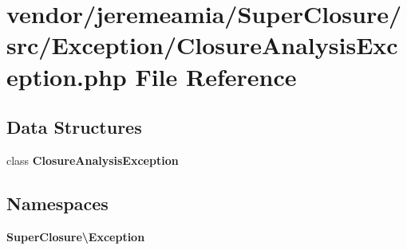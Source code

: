 \section{vendor/jeremeamia/\+Super\+Closure/src/\+Exception/\+Closure\+Analysis\+Exception.php File Reference}
\label{_closure_analysis_exception_8php}
\subsection*{Data Structures}
\begin{DoxyCompactItemize}
\item 
class {\bf Closure\+Analysis\+Exception}
\end{DoxyCompactItemize}
\subsection*{Namespaces}
\begin{DoxyCompactItemize}
\item 
 {\bf Super\+Closure\textbackslash{}\+Exception}
\end{DoxyCompactItemize}

